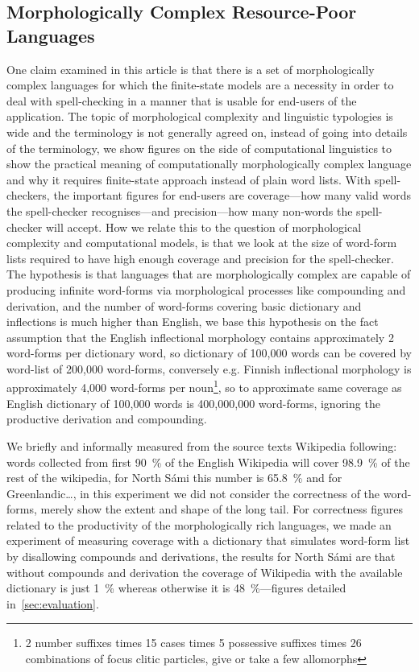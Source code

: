 \documentclass[a4paper,12pt]{article}
\begin{document}
\subsection{Morphologically Complex Resource-Poor Languages}
\label{subsec:morphologically-complex}

One claim examined in this article is that there is a set of morphologically
complex languages for which the finite-state models are a necessity in order to
deal with spell-checking in a manner that is usable for end-users of the
application.  The topic of morphological complexity and linguistic typologies
is wide and the terminology is not generally agreed on, instead of going into
details of the terminology, we show figures on the side of computational
linguistics to show the practical meaning of computationally morphologically
complex language and why it requires finite-state approach instead of plain
word lists. With spell-checkers, the important figures for end-users are
coverage---how many valid words the spell-checker recognises---and
precision---how many non-words the spell-checker will accept. How we relate
this to the question of morphological complexity and computational models, is
that we look at the size of word-form lists required to have high enough
coverage and precision for the spell-checker. The hypothesis is that languages
that are morphologically complex are capable of producing infinite word-forms
via morphological processes like compounding and derivation, and the number of
word-forms covering basic dictionary and inflections is much higher than
English, we base this hypothesis on the fact assumption that the English
inflectional morphology contains approximately 2 word-forms per dictionary
word, so dictionary of 100,000 words can be covered by word-list of 200,000
word-forms, conversely e.g. Finnish inflectional morphology is approximately
4,000 word-forms per noun\footnote{2 number suffixes times 15 cases times 5
possessive suffixes times 26 combinations of focus clitic particles, give or
take a few allomorphs}, so to approximate same coverage as English dictionary
of 100,000 words is 400,000,000 word-forms, ignoring the productive derivation
and compounding.

We briefly and informally measured from the source texts Wikipedia following:
words collected from first 90~\% of the English Wikipedia will cover 98.9~\%
of the rest of the wikipedia, for North Sámi this number is 65.8~\% and for
Greenlandic\ldots, in this experiment we did not consider the correctness
of the word-forms, merely show the extent and shape of the long tail. For
correctness figures related to the productivity of the morphologically
rich languages, we made an experiment of measuring coverage with a dictionary
that simulates word-form list by disallowing compounds and derivations, the
results for North Sámi are that without compounds and derivation the
coverage of Wikipedia with the available dictionary is just 1~\% whereas
otherwise it is 48~\%---figures detailed in~\ref{sec:evaluation}.
\end{document}
